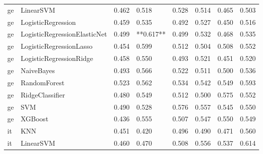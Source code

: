 \begin{tabular}{llllllll}
      ge &                    LinearSVM & 0.462 &                     0.518 &                 0.528 &                  0.514 &                                   0.465 &     0.503 \\
      ge &           LogisticRegression & 0.459 &                     0.535 &                 0.492 &                  0.527 &                                   0.450 &     0.516 \\
      ge & LogisticRegressionElasticNet & 0.499 &                 **0.617** &                 0.499 &                  0.532 &                                   0.468 &     0.535 \\
      ge &      LogisticRegressionLasso & 0.454 &                     0.599 &                 0.512 &                  0.504 &                                   0.508 &     0.552 \\
      ge &      LogisticRegressionRidge & 0.458 &                     0.550 &                 0.493 &                  0.521 &                                   0.451 &     0.520 \\
      ge &                   NaiveBayes & 0.493 &                     0.566 &                 0.522 &                  0.511 &                                   0.500 &     0.536 \\
      ge &                 RandomForest & 0.523 &                     0.562 &                 0.534 &                  0.542 &                                   0.549 &     0.593 \\
      ge &              RidgeClassifier & 0.480 &                     0.549 &                 0.512 &                  0.500 &                                   0.575 &     0.552 \\
      ge &                          SVM & 0.490 &                     0.528 &                 0.576 &                  0.557 &                                   0.545 &     0.550 \\
      ge &                      XGBoost & 0.436 &                     0.555 &                 0.507 &                  0.547 &                                   0.550 &     0.549 \\
      it &                          KNN & 0.451 &                     0.420 &                 0.496 &                  0.490 &                                   0.471 &     0.560 \\
      it &                    LinearSVM & 0.460 &                     0.470 &                 0.508 &                  0.556 &                                   0.537 &     0.614 \\

\end{tabular}

